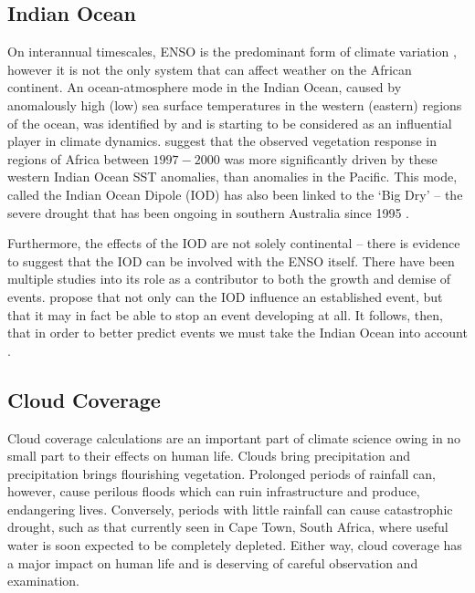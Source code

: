 \subsection{Indian Ocean}
On interannual timescales, ENSO is the predominant form of climate variation
\citep{obrien1998}, however it is not the only system that can affect weather on
the African continent. An ocean-atmosphere mode in the Indian Ocean, caused by
anomalously high (low) sea surface temperatures in the western (eastern) regions
of the ocean, was identified by \cite{saji1999} and is starting to be considered
as an influential player in climate dynamics. \cite{anyamba2002} suggest that
the observed vegetation response in regions of Africa between $1997-2000$ was
more significantly driven by these western Indian Ocean SST anomalies, than
anomalies in the Pacific. This mode, called the Indian Ocean Dipole (IOD) has
also been linked to the `Big Dry' -- the severe drought that has been ongoing in
southern Australia since 1995 \citep{karumuri2003, ummenhofer2009}.

Furthermore, the effects of the IOD are not solely continental -- there is
evidence to suggest that the IOD can be involved with the ENSO itself. There
have been multiple studies into its role as a contributor to both the growth
\citep{annamalai2005, hackert2017} and demise \citep{okumura2010, kug2006,
  xie2009, dayan2015} of \elnino{} events. \cite{dong2018} propose that not only
can the IOD influence an established \elnino{} event, but that it may in fact be
able to stop an \elnino{} event developing at all. It follows, then, that in
order to better predict \elnino{} events we must take the Indian Ocean into
account \citep{hackert2017}.

\subsection{Cloud Coverage}
\label{sec:intro:cc}
Cloud coverage calculations are an important part of climate science owing in no
small part to their effects on human life. Clouds bring precipitation and
precipitation brings flourishing vegetation. Prolonged periods of rainfall can,
however, cause perilous floods which can ruin infrastructure and produce,
endangering lives. Conversely, periods with little rainfall can cause
catastrophic drought, such as that currently seen in Cape Town, South Africa,
where useful water is soon expected to be completely depleted. Either way, cloud
coverage has a major impact on human life and is deserving of careful
observation and examination.

